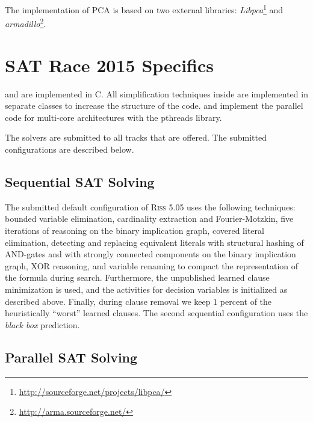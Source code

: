 \documentclass[conference]{IEEEtran}
\def\CC{{C\nolinebreak[4]\hspace{-.05em}\raisebox{.4ex}{\tiny\bf ++}}}
\begin{document}
The implementation of PCA is based on two external libraries: \emph{Libpca}\footnote{\url{http://sourceforge.net/projects/libpca/}} and \emph{armadillo}\footnote{\url{http://arma.sourceforge.net/}}.

%  

\section{SAT Race 2015 Specifics}

\riss and \coprocessor are implemented in \CC. 
All simplification techniques inside \coprocessor are implemented in separate classes to increase the structure of the code. 
\priss and \pcasso implement the parallel code for multi-core architectures with the pthreads library.

The solvers are submitted to all tracks that are offered. 
The submitted configurations are described below. 

\subsection{Sequential SAT Solving}

The submitted default configuration of \textsc{Riss 5.05} uses the following techniques:
%
bounded variable elimination, 
cardinality extraction and Fourier-Motzkin, 
five iterations of reasoning on the binary implication graph,
covered literal elimination,
detecting and replacing equivalent literals with structural hashing of AND-gates and with strongly connected components on the binary implication graph,
XOR reasoning, 
and variable renaming to compact the representation of the formula during search. 
Furthermore, the unpublished learned clause minimization is used, and the activities for decision variables is initialized as described above. 
Finally, during clause removal we keep $1$ percent of the heuristically ``worst'' learned clauses. 
The second sequential configuration uses the \emph{black box} prediction. 


\subsection{Parallel SAT Solving}
\end{document}
